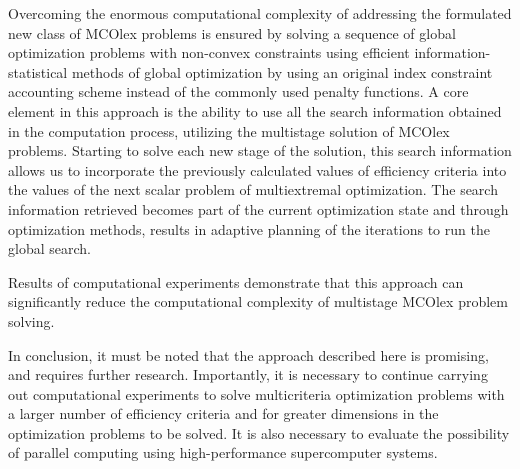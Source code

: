 \documentclass[smallextended]{svjour3}       %
\begin{document}
Overcoming the enormous computational complexity of addressing the formulated new class of MCOlex problems is ensured by solving a sequence of global optimization problems with non-convex constraints using efficient information-statistical methods of global optimization by using an original index constraint accounting scheme instead of the commonly used penalty functions. A core element in this approach is the ability to use all the search information obtained in the computation process, utilizing the multistage solution of MCOlex problems. Starting to solve each new stage of the solution, this search information allows us to incorporate the previously calculated values of efficiency criteria into the values of the next scalar problem of multiextremal optimization. The search information retrieved becomes part of the current optimization state and through optimization methods, results in adaptive planning of the iterations to run the global search. 

Results of computational experiments demonstrate that this approach can significantly reduce the computational complexity of multistage MCOlex problem solving.

In conclusion, it must be noted that the approach described here is promising, and requires further research. Importantly, it is necessary to continue carrying out computational experiments to solve multicriteria optimization problems with a larger number of efficiency criteria and for greater dimensions in the optimization problems to be solved. It is also necessary to evaluate the possibility of parallel computing using high-performance supercomputer systems.
\end{document}
